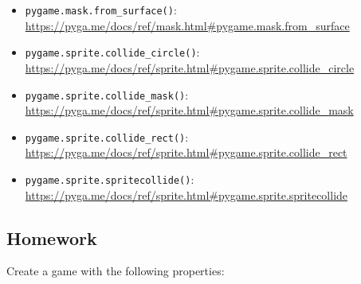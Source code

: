 \begin{pygbox}
\begin{itemize}
	\item \texttt{pygame.mask.from\_surface()}:
	\\ 
    \url{https://pyga.me/docs/ref/mask.html#pygame.mask.from_surface}
	
	\item \texttt{pygame.sprite.collide\_circle()}:
	\\ 
    \url{https://pyga.me/docs/ref/sprite.html#pygame.sprite.collide_circle}

	\item \texttt{pygame.sprite.collide\_mask()}:
	\\ 
    \url{https://pyga.me/docs/ref/sprite.html#pygame.sprite.collide_mask}

	\item \texttt{pygame.sprite.collide\_rect()}:
	\\ 
    \url{https://pyga.me/docs/ref/sprite.html#pygame.sprite.collide_rect}
	
	\item \texttt{pygame.sprite.spritecollide()}:
	\\ 
    \url{https://pyga.me/docs/ref/sprite.html#pygame.sprite.spritecollide}
	
\end{itemize}
\end{pygbox}

\subsection{Homework}

%

Create a game with the following properties:

